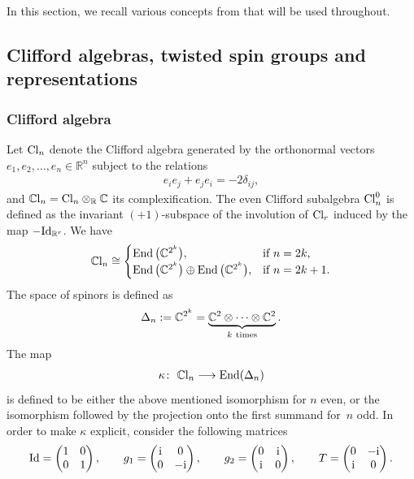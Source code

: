 \documentclass[pdftex]{sigma}
\newcommand{\lra}{\longrightarrow}
\numberwithin{equation}{section}
\begin{document}
In this section, we recall various concepts from \cite{Espinosa-Herrera, Friedrich,Lawson} that will be used throughout.

\subsection{Clifford algebras, twisted spin groups and representations}

\subsubsection{Clifford algebra}

Let ${\rm Cl}_n$ denote the Clifford algebra generated by the orthonormal vectors $e_1, e_2, \dots, e_n\in \mathbb{R}^n$ subject to the relations
\begin{gather*}
e_i e_j + e_j e_i = -2\delta_{ij},
\end{gather*}
and $\mathbb{C}{\rm l}_n={\rm Cl}_n\otimes_{\mathbb{R}}\mathbb{C}$ its complexification. The even Clifford subalgebra ${\rm Cl}_n^0$ is defined as the invariant $(+1)$-subspace of the involution of ${\rm Cl}_r$
induced
by the map $-{\rm Id}_{\mathbb{R}^r}$.
We have
\begin{gather*} \mathbb{C}{\rm l}_n\cong
 \begin{cases}
 \operatorname{End}\big(\mathbb{C}^{2^k}\big), & \mbox{if $n=2k$,}\\
 \operatorname{End}\big(\mathbb{C}^{2^k}\big)\oplus\operatorname{End}\big(\mathbb{C}^{2^k}\big), & \mbox{if $n=2k+1$.}
 \end{cases}
\end{gather*}
The space of spinors is defined as
\begin{gather*} \Delta_n:=\mathbb{C}^{2^k}=\underbrace{\mathbb{C}^2\otimes \dots \otimes \mathbb{C}^2}_{k\ {\rm times}}.\end{gather*}
The map
\begin{gather*} \kappa\colon \ \mathbb{C}{\rm l}_n \lra \operatorname{End}(\Delta_n)\end{gather*}
is defined to be either the above mentioned isomorphism for $n$ even, or the isomorphism followed by the projection onto the first summand for~$n$ odd. In order to make $\kappa$ explicit, consider the following matrices
\begin{gather*} {\rm Id} = \left(\begin{matrix}
1 & 0\\
0 & 1
 \end{matrix}\right),\qquad
g_1 = \left(\begin{matrix}
{\rm i} & 0\\
0 & -{\rm i}
 \end{matrix}\right),\qquad
g_2 = \left(\begin{matrix}
0 & {\rm i}\\
{\rm i} & 0
 \end{matrix}\right),\qquad
T = \left(\begin{matrix}
0 & -{\rm i}\\
{\rm i} & 0
 \end{matrix}\right).
\end{gather*}
\end{document}
